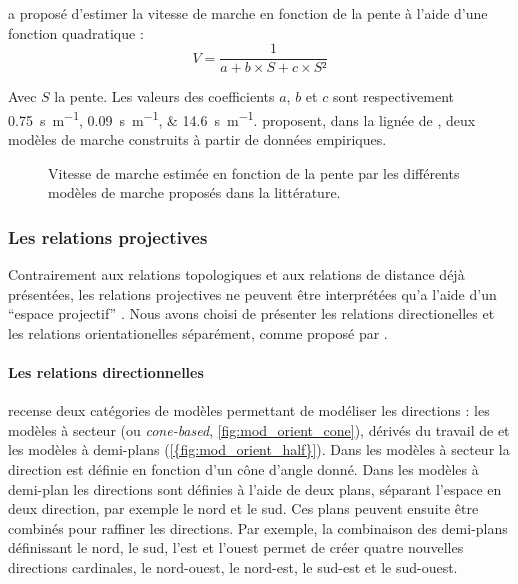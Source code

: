 \textcite{Rees2004} a proposé d'estimer la vitesse de marche en
fonction de la pente à l'aide d'une fonction quadratique :
\begin{equation}
  V = \dfrac{1}{a + b × S + c × S²}
\end{equation}

Avec \(S\) la pente. Les valeurs des coefficients \(a\), \(b\) et
\(c\) sont respectivement \SIlist{0,75;0,09;14,6}{\second\per\meter}.
\textcite{Irmischer2017,Kerouanton2020} proposent, dans la lignée de
\textcite{Tobler1993}, deux modèles de marche construits à partir de
données empiriques.



\begin{figure}
  \centering
  
  \caption{Vitesse de marche estimée en fonction de la pente par les
    différents modèles de marche proposés dans la littérature.}
  \label{fig:modeles_marche}
\end{figure}


\subsubsection{Les relations projectives}

Contrairement aux relations topologiques et aux relations de distance
déjà présentées, les relations projectives ne peuvent être
interprétées qu'a l'aide d'un \enquote{espace projectif}
\autocite{Duchene2019}. Nous avons choisi de présenter les relations
directionelles et les relations orientationelles séparément, comme
proposé par \textcite{Duchene2019}.


\paragraph{Les relations directionnelles}

\textcite{Frank1992} recense deux catégories de modèles permettant de
modéliser les directions : les modèles à secteur (ou
\emph{cone-based}, \autoref{fig:mod_orient_cone}), dérivés du travail
de \textcite{Peuquet1987} et les modèles à demi-plans
(\autoref{{fig:mod_orient_half}}). Dans les modèles à secteur la
direction est définie en fonction d'un cône d'angle donné. Dans les
modèles à demi-plan les directions sont définies à l'aide de deux
plans, séparant l'espace en deux direction, par exemple le nord et le
sud. Ces plans peuvent ensuite être combinés pour raffiner les
directions. Par exemple, la combinaison des demi-plans définissant le
nord, le sud, l'est et l'ouest permet de créer quatre nouvelles
directions cardinales, le nord-ouest, le nord-est, le sud-est et le
sud-ouest.

